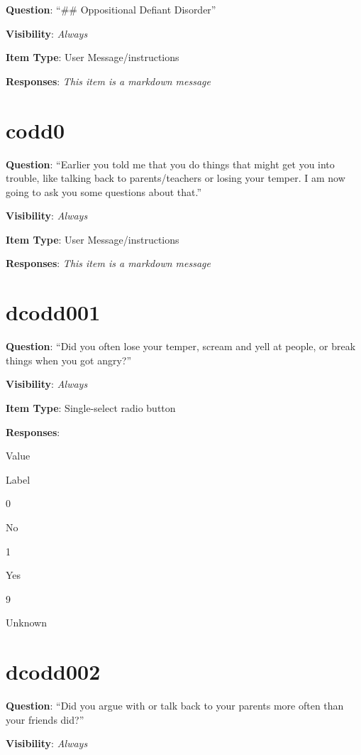 \documentclass[]{book}
\begin{document}
\textbf{Question}: ``\#\# Oppositional Defiant Disorder''

\textbf{Visibility}: \emph{Always}

\textbf{Item Type}: User Message/instructions

\textbf{Responses}: \emph{This item is a markdown message}

\hypertarget{codd0}{%
\section{codd0}\label{codd0}}

\textbf{Question}: ``Earlier you told me that you do things that might get you into trouble, like talking back to parents/teachers or losing your temper. I am now going to ask you some questions about that.''

\textbf{Visibility}: \emph{Always}

\textbf{Item Type}: User Message/instructions

\textbf{Responses}: \emph{This item is a markdown message}

\hypertarget{dcodd001}{%
\section{dcodd001}\label{dcodd001}}

\textbf{Question}: ``Did you often lose your temper, scream and yell at people, or break things when you got angry?''

\textbf{Visibility}: \emph{Always}

\textbf{Item Type}: Single-select radio button

\textbf{Responses}:

Value

Label

0

No

1

Yes

9

Unknown

\hypertarget{dcodd002}{%
\section{dcodd002}\label{dcodd002}}

\textbf{Question}: ``Did you argue with or talk back to your parents more often than your friends did?''

\textbf{Visibility}: \emph{Always}
\end{document}
